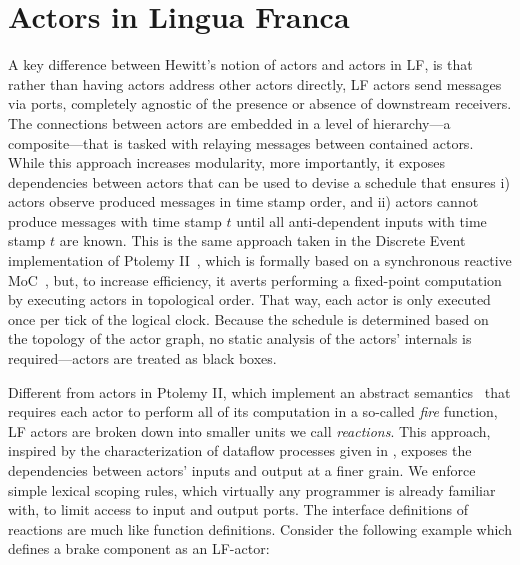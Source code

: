 \documentclass[sigconf]{acmart}
\newcommand{\todo}[1]{\mynote{TODO}{#1}{red}}
\begin{document}
\section{Actors in Lingua Franca}\label{sec:actor}
A key difference between Hewitt's notion of actors and actors in LF, is that rather than having actors address other actors directly, LF actors send messages via ports, completely agnostic of the presence or absence of downstream receivers. The connections between actors are embedded in a level of hierarchy---a composite---that is tasked with relaying messages between contained actors. While this approach increases modularity, more importantly, it exposes dependencies between actors that can be used to devise a schedule that ensures i) actors observe produced messages in time stamp order, and ii) actors cannot produce messages with time stamp $t$ until all anti-dependent inputs with time stamp $t$ are known. This is the same approach taken in the Discrete Event implementation of Ptolemy II~\cite{LeeEtAl:7:DiscreteEvents}, which is formally based on a synchronous reactive MoC~\todo{[Benveniste,Berry,1991]}, but, to increase efficiency, it averts performing a fixed-point computation by executing actors in topological order. That way, each actor is only executed once per tick of the logical clock. Because the schedule is determined based on the topology of the actor graph, no static analysis of the actors' internals is required---actors are treated as black boxes.

Different from actors in Ptolemy II, which implement an abstract semantics~\cite{TripakisEtAl:12:AbstractSemantics} that requires each actor to perform all of its computation in a so-called \emph{fire} function, LF actors are broken down into smaller units we call \emph{reactions}. This approach, inspired by the characterization of dataflow processes given in \cite{LeeMatsikoudis:09:Dataflow}, exposes the dependencies between actors' inputs and output at a finer grain. We enforce simple lexical scoping rules, which virtually any programmer is already familiar with, to limit access to input and output ports. The interface definitions of reactions are much like function definitions. Consider the following example which defines a brake component as an LF-actor:
\end{document}
